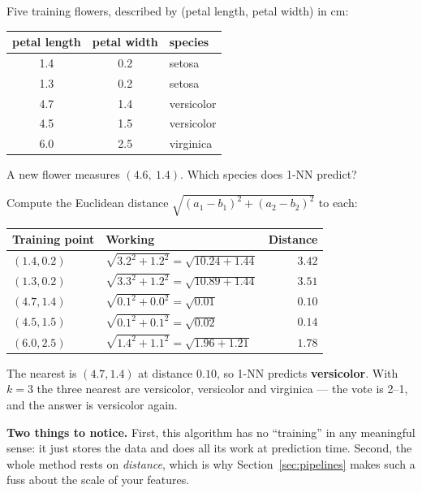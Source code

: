 \documentclass[11pt]{article}
\begin{document}
\begin{worked}
Five training flowers, described by (petal length, petal width) in cm:

\begin{center}
\begin{tabular}{@{}ccl@{}}
\toprule
\textbf{petal length} & \textbf{petal width} & \textbf{species}\\
\midrule
1.4 & 0.2 & setosa\\
1.3 & 0.2 & setosa\\
4.7 & 1.4 & versicolor\\
4.5 & 1.5 & versicolor\\
6.0 & 2.5 & virginica\\
\bottomrule
\end{tabular}
\end{center}

A new flower measures $(4.6,\ 1.4)$. Which species does 1-NN predict?

Compute the Euclidean distance $\sqrt{(a_1-b_1)^2 + (a_2-b_2)^2}$ to each:

\begin{center}
\begin{tabular}{@{}llr@{}}
\toprule
\textbf{Training point} & \textbf{Working} & \textbf{Distance}\\
\midrule
$(1.4, 0.2)$ & $\sqrt{3.2^2 + 1.2^2} = \sqrt{10.24 + 1.44}$ & $3.42$\\
$(1.3, 0.2)$ & $\sqrt{3.3^2 + 1.2^2} = \sqrt{10.89 + 1.44}$ & $3.51$\\
$(4.7, 1.4)$ & $\sqrt{0.1^2 + 0.0^2} = \sqrt{0.01}$ & $\mathbf{0.10}$\\
$(4.5, 1.5)$ & $\sqrt{0.1^2 + 0.1^2} = \sqrt{0.02}$ & $0.14$\\
$(6.0, 2.5)$ & $\sqrt{1.4^2 + 1.1^2} = \sqrt{1.96 + 1.21}$ & $1.78$\\
\bottomrule
\end{tabular}
\end{center}

The nearest is $(4.7, 1.4)$ at distance $0.10$, so 1-NN predicts
\textbf{versicolor}. With $k=3$ the three nearest are versicolor, versicolor and
virginica --- the vote is 2--1, and the answer is versicolor again.

\textbf{Two things to notice.} First, this algorithm has no ``training'' in any
meaningful sense: it just stores the data and does all its work at prediction
time. Second, the whole method rests on \emph{distance}, which is why
Section~\ref{sec:pipelines} makes such a fuss about the scale of your features.
\end{worked}
\end{document}
